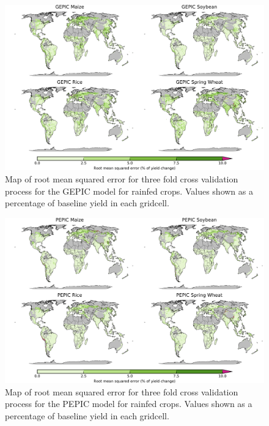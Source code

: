 \documentclass[10pt]{article}
\begin{document}
\begin{figure}[h!]
\centering
\includegraphics[width=15.5cm]{GEPIC_spatial_MSE_ton_ha.png}
\caption{Map of root mean squared error for three fold cross validation process for the GEPIC model for rainfed crops. Values shown as a percentage of baseline yield in each gridcell.}
\label{fig:pdssatrmse}
\end{figure}

\begin{figure}[h!]
\centering
\includegraphics[width=15.5cm]{PEPIC_spatial_MSE_ton_ha.png}
\caption{Map of root mean squared error for three fold cross validation process for the PEPIC model for rainfed crops. Values shown as a percentage of baseline yield in each gridcell.}
\label{fig:pdssatrmse}
\end{figure}
\end{document}
